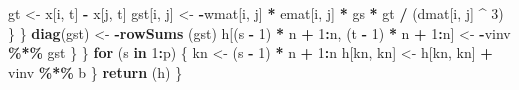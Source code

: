 \documentclass[
  12pt,
]{article}
\newenvironment{Shaded}{\begin{snugshade}}{\end{snugshade}}
\newcommand{\ControlFlowTok}[1]{\textcolor[rgb]{0.13,0.29,0.53}{\textbf{#1}}}
\newcommand{\DecValTok}[1]{\textcolor[rgb]{0.00,0.00,0.81}{#1}}
\newcommand{\FunctionTok}[1]{\textcolor[rgb]{0.13,0.29,0.53}{\textbf{#1}}}
\newcommand{\NormalTok}[1]{#1}
\newcommand{\OtherTok}[1]{\textcolor[rgb]{0.56,0.35,0.01}{#1}}
\newcommand{\SpecialCharTok}[1]{\textcolor[rgb]{0.81,0.36,0.00}{\textbf{#1}}}
\begin{document}
\begin{Shaded}
\begin{Highlighting}[]
\NormalTok{          gt }\OtherTok{\textless{}{-}}\NormalTok{ x[i, t] }\SpecialCharTok{{-}}\NormalTok{ x[j, t]}
\NormalTok{          gst[i, j] }\OtherTok{\textless{}{-}}
            \SpecialCharTok{{-}}\NormalTok{wmat[i, j] }\SpecialCharTok{*}\NormalTok{ emat[i, j] }\SpecialCharTok{*}\NormalTok{ gs }\SpecialCharTok{*}\NormalTok{ gt }\SpecialCharTok{/}\NormalTok{ (dmat[i, j] }\SpecialCharTok{\^{}} \DecValTok{3}\NormalTok{)}
\NormalTok{        \}}
\NormalTok{      \}}
      \FunctionTok{diag}\NormalTok{(gst) }\OtherTok{\textless{}{-}} \SpecialCharTok{{-}}\FunctionTok{rowSums}\NormalTok{ (gst)}
\NormalTok{      h[(s }\SpecialCharTok{{-}} \DecValTok{1}\NormalTok{) }\SpecialCharTok{*}\NormalTok{ n }\SpecialCharTok{+} \DecValTok{1}\SpecialCharTok{:}\NormalTok{n, (t }\SpecialCharTok{{-}} \DecValTok{1}\NormalTok{) }\SpecialCharTok{*}\NormalTok{ n }\SpecialCharTok{+} \DecValTok{1}\SpecialCharTok{:}\NormalTok{n] }\OtherTok{\textless{}{-}} \SpecialCharTok{{-}}\NormalTok{vinv }\SpecialCharTok{\%*\%}\NormalTok{ gst}
\NormalTok{    \}}
\NormalTok{  \}}
  \ControlFlowTok{for}\NormalTok{ (s }\ControlFlowTok{in} \DecValTok{1}\SpecialCharTok{:}\NormalTok{p) \{}
\NormalTok{    kn }\OtherTok{\textless{}{-}}\NormalTok{ (s }\SpecialCharTok{{-}} \DecValTok{1}\NormalTok{) }\SpecialCharTok{*}\NormalTok{ n }\SpecialCharTok{+} \DecValTok{1}\SpecialCharTok{:}\NormalTok{n}
\NormalTok{    h[kn, kn] }\OtherTok{\textless{}{-}}\NormalTok{ h[kn, kn] }\SpecialCharTok{+}\NormalTok{ vinv }\SpecialCharTok{\%*\%}\NormalTok{ b}
\NormalTok{  \}}
  \FunctionTok{return}\NormalTok{ (h)}
\NormalTok{\}}


\end{Highlighting}
\end{Shaded}
\end{document}
